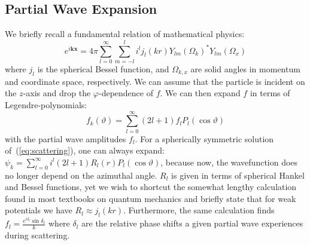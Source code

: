 \subsection{Partial Wave Expansion}
We briefly recall a fundamental relation of mathematical physics:
\begin{equation}\label{eq:expexp}
	e^{i\mathbf{k}\mathbf{x}}=4\pi\sum_{l=0}^{\infty}\sum_{m=-l}^l i^lj_l(kr)Y_{lm}(\Omega_k)^*Y_{lm}(\Omega_x)
\end{equation}where $j_l$ is the spherical Bessel function, and $\Omega_{k,x}$ are solid angles in momentum and coordinate space, respectively.
We can assume that the particle is incident on the $z$-axis and drop the $\varphi$-dependence of $f$. We can then expand $f$ in terms of Legendre-polynomials:
\begin{equation}\label{eq:finleg}
	f_k(\vartheta)=\sum_{l=0}^{\infty}(2l+1)f_lP_l(\cos\vartheta)
\end{equation}
with the partial wave amplitudes $f_l$. For a spherically symmetric solution of~(\ref{eq:scattering}), one can always 
expand: $\psi_k=\sum_{l=0}^{\infty}i^l(2l+1)R_l(r)P_l(\cos\vartheta)$, because now, the wavefunction does no longer depend on the azimuthal angle. $R_l$ is given in 
terms of spherical Hankel and Bessel functions, yet we wish to shortcut the somewhat lengthy calculation found in most textbooks on quantum mechanics and briefly state 
that for weak potentials we have $R_l\approx j_l(kr)$. Furthermore, the same calculation finds $f_l=\frac{e^{i\delta_l}\sin\delta_l}{k}$ where $\delta_l$ are the 
relative phase shifts a given partial wave experiences during scattering. 

